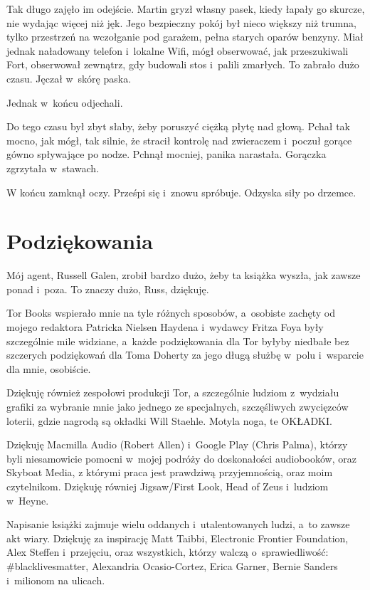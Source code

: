 \documentclass[oneside,polish,11pt,sfheadings]{mwbk}
\begin{document}
Tak długo zajęło im odejście. Martin gryzł własny pasek, kiedy łapały go
skurcze, nie wydając więcej niż jęk. Jego bezpieczny pokój był nieco
większy niż trumna, tylko przestrzeń na wczołganie pod garażem, pełna
starych oparów benzyny. Miał jednak naładowany telefon i~lokalne Wifi,
mógł obserwować, jak przeszukiwali Fort, obserwował zewnątrz, gdy
budowali stos i~palili zmarłych. To zabrało dużo czasu. Jęczał w~skórę
paska.

Jednak w~końcu odjechali.

Do tego czasu był zbyt słaby, żeby poruszyć ciężką płytę nad głową.
Pchał tak mocno, jak mógł, tak silnie, że stracił kontrolę nad
zwieraczem i~poczuł gorące gówno spływające po nodze. Pchnął mocniej,
panika narastała. Gorączka zgrzytała w~stawach.

W końcu zamknął oczy. Prześpi się i~znowu spróbuje. Odzyska siły po
drzemce.


\chapter*{Podziękowania}

Mój agent, Russell Galen, zrobił bardzo dużo, żeby ta książka wyszła,
jak zawsze ponad i~poza. To znaczy dużo, Russ, dziękuję. 

Tor Books wspierało mnie na tyle różnych sposobów, a~osobiste zachęty od mojego
redaktora Patricka Nielsen Haydena i~wydawcy Fritza Foya były
szczególnie mile widziane, a~każde podziękowania dla Tor byłyby niedbałe
bez szczerych podziękowań dla Toma Doherty za jego długą służbę w~polu i~wsparcie dla mnie, osobiście. 

Dziękuję również zespołowi produkcji Tor,
a szczególnie ludziom z~wydziału grafiki za wybranie mnie jako jednego
ze specjalnych, szczęśliwych zwycięzców loterii, gdzie nagrodą są
okładki Will Staehle. Motyla noga, te OKŁADKI. 

Dziękuję Macmilla Audio
(Robert Allen) i~Google Play (Chris Palma), którzy byli niesamowicie
pomocni w~mojej podróży do doskonałości audiobooków, oraz Skyboat Media,
z którymi praca jest prawdziwą przyjemnością, oraz moim czytelnikom.
Dziękuję równiej Jigsaw/First Look, Head of Zeus i~ludziom w~Heyne.

Napisanie książki zajmuje wielu oddanych i~utalentowanych ludzi, a~to
zawsze akt wiary. Dziękuję za inspirację Matt Taibbi, Electronic
Frontier Foundation, Alex Steffen i~przejęciu, oraz wszystkich, którzy
walczą o~sprawiedliwość: \#blacklivesmatter, Alexandria Ocasio-Cortez,
Erica Garner, Bernie Sanders i~milionom na ulicach. 
\end{document}
